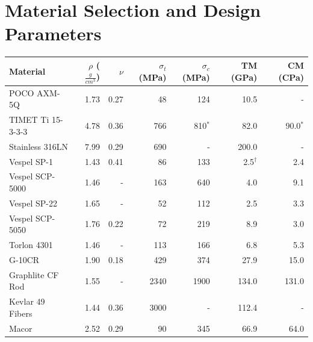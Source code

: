\documentclass[final]{svjour2}
\begin{document}
\section{Material Selection and Design Parameters}

\begin{table}[h]%
\begin{tabular}{lrrrrrr}
\toprule
\textbf{Material} & $\rho$ ($\frac{g}{cm^3}$) & $\nu$ & $\sigma_{t}$ (MPa) & $\sigma_{c}$ (MPa) & TM (GPa) & CM (CPa) \\
\midrule
 POCO AXM-5Q & 1.73 & 0.27 & 48 & 124\phantom{$^*$} & 10.5\phantom{$^{\dag}$} & -\phantom{$^*$} \\
 TIMET Ti 15-3-3-3 & 4.78 & 0.36 & 766 & 810$^*$ & 82.0\phantom{$^{\dag}$} & 90.0$^*$ \\
 Stainless 316LN & 7.99 & 0.29 & 690 & -\phantom{$^*$} & 200.0\phantom{$^{\dag}$} & -\phantom{$^*$} \\
 Vespel SP-1 & 1.43 & 0.41 & 86 & 133\phantom{$^*$} & 2.5$^{\dag}$ & 2.4\phantom{$^*$} \\
 Vespel SCP-5000 & 1.46 & - & 163 & 640\phantom{$^*$} & 4.0\phantom{$^{\dag}$} & 9.1\phantom{$^*$} \\
 Vespel SP-22 & 1.65 & - & 52 & 112\phantom{$^*$} & 2.5\phantom{$^{\dag}$} & 3.3\phantom{$^*$} \\
 Vespel SCP-5050 & 1.76 & 0.22 & 72 & 219\phantom{$^*$} & 8.9\phantom{$^{\dag}$} & 3.0\phantom{$^*$} \\
 Torlon 4301 & 1.46 & - & 113 & 166\phantom{$^*$} & 6.8\phantom{$^{\dag}$} & 5.3\phantom{$^*$} \\
 G-10CR & 1.90 & 0.18 & 429 & 374\phantom{$^*$} & 27.9\phantom{$^{\dag}$} & 15.0\phantom{$^*$} \\
 Graphlite CF Rod & 1.55 & -  & 2340 & 1900\phantom{$^*$} & 134.0\phantom{$^{\dag}$} & 131.0\phantom{$^*$} \\
 Kevlar 49 Fibers & 1.44 & 0.36 & 3000 & -\phantom{$^*$} & 112.4\phantom{$^{\dag}$} & -\phantom{$^*$} \\
 Macor & 2.52 & 0.29 & 90 & 345\phantom{$^*$} & 66.9\phantom{$^{\dag}$} & 64.0\phantom{$^*$} \\


\end{tabular}
\end{table}
\end{document}
